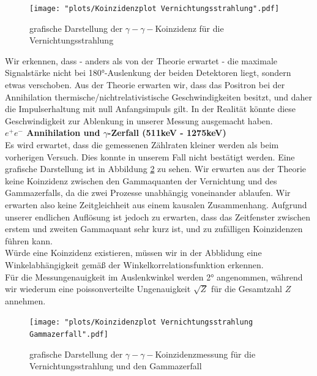 \documentclass[%
aps,
onecolumn,
11pt,
tightenlines,
nofootinbib,
superscriptaddress,
floatfix,
prd,
]{revtex4-2}
\begin{document}
\begin{figure}[H]
	\centering
	\texttt{[image: "plots/Koinzidenzplot Vernichtungsstrahlung".pdf]}
	\caption{grafische Darstellung der $\gamma - \gamma -$Koinzidenz für die Vernichtungsstrahlung}
	\label{fig:coincidenceannihilation}
\end{figure}
Wir erkennen, dass - anders als von der Theorie erwartet - die maximale Signalstärke nicht bei 180°-Auslenkung der beiden Detektoren liegt, sondern etwas verschoben. Aus der Theorie erwarten wir, dass das Positron bei der Annihilation thermische/nichtrelativistische Geschwindigkeiten besitzt, und daher die Impulserhaltung mit null Anfangsimpuls gilt. In der Realität könnte diese Geschwindigkeit zur Ablenkung in unserer Messung ausgemacht haben. \vspace{10pt}\\
\textbf{$e^+e^- $ Annihilation und $\gamma$-Zerfall (511keV - 1275keV)}\\
Es wird erwartet, dass die gemessenen Zählraten kleiner werden als beim vorherigen Versuch. Dies konnte in unserem Fall nicht bestätigt werden. Eine grafische Darstellung ist in Abbildung \ref{fig:coincidenceannihilgamma} zu sehen. Wir erwarten aus der Theorie keine Koinzidenz zwischen den Gammaquanten der Vernichtung und des Gammazerfalls, da die zwei Prozesse unabhängig voneinander ablaufen. Wir erwarten also keine Zeitgleichheit aus einem kausalen Zusammenhang. Aufgrund unserer endlichen Auflösung ist jedoch zu erwarten, dass das Zeitfenster zwischen erstem und zweiten Gammaquant sehr kurz ist, und zu zufälligen Koinzidenzen führen kann. \\
Würde eine Koinzidenz existieren, müssen wir in der Abblidung eine Winkelabhängigkeit gemäß der Winkelkorrelationsfunktion erkennen. \\
Für die Messungenauigkeit im Auslenkwinkel werden 2° angenommen, während wir wiederum eine poissonverteilte Ungenauigkeit $\sqrt{Z}$ für die Gesamtzahl $Z$ annehmen. 

\begin{figure}[H]
	\centering
	\texttt{[image: "plots/Koinzidenzplot Vernichtungsstrahlung Gammazerfall".pdf]}
	\caption{grafische Darstellung der $\gamma - \gamma -$Koinzidenzmessung für die Vernichtungsstrahlung und den Gammazerfall}
	\label{fig:coincidenceannihilgamma}
\end{figure}
\end{document}
